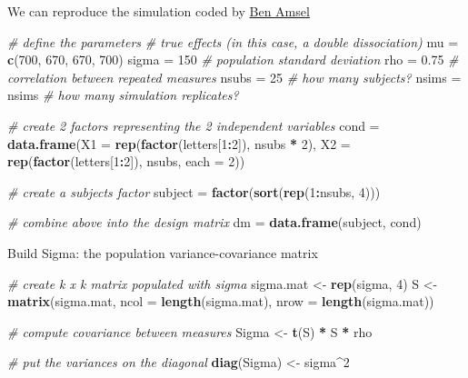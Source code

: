 \documentclass[
]{book}
\newenvironment{Shaded}{\begin{snugshade}}{\end{snugshade}}
\newcommand{\CommentTok}[1]{\textcolor[rgb]{0.56,0.35,0.01}{\textit{#1}}}
\newcommand{\DataTypeTok}[1]{\textcolor[rgb]{0.13,0.29,0.53}{#1}}
\newcommand{\DecValTok}[1]{\textcolor[rgb]{0.00,0.00,0.81}{#1}}
\newcommand{\FloatTok}[1]{\textcolor[rgb]{0.00,0.00,0.81}{#1}}
\newcommand{\KeywordTok}[1]{\textcolor[rgb]{0.13,0.29,0.53}{\textbf{#1}}}
\newcommand{\NormalTok}[1]{#1}
\newcommand{\OperatorTok}[1]{\textcolor[rgb]{0.81,0.36,0.00}{\textbf{#1}}}
\newcommand{\StringTok}[1]{\textcolor[rgb]{0.31,0.60,0.02}{#1}}
\begin{document}
We can reproduce the simulation coded by \href{https://cognitivedatascientist.com/2015/12/14/power-simulation-in-r-the-repeated-measures-anova-5/}{Ben Amsel}

\begin{Shaded}
\begin{Highlighting}[]
\CommentTok{# define the parameters}
\CommentTok{# true effects (in this case, a double dissociation)}
\NormalTok{mu =}\StringTok{ }\KeywordTok{c}\NormalTok{(}\DecValTok{700}\NormalTok{, }\DecValTok{670}\NormalTok{, }\DecValTok{670}\NormalTok{, }\DecValTok{700}\NormalTok{) }
\NormalTok{sigma =}\StringTok{ }\DecValTok{150}  \CommentTok{# population standard deviation}
\NormalTok{rho =}\StringTok{ }\FloatTok{0.75} \CommentTok{# correlation between repeated measures}
\NormalTok{nsubs =}\StringTok{ }\DecValTok{25} \CommentTok{# how many subjects?}
\NormalTok{nsims =}\StringTok{ }\NormalTok{nsims }\CommentTok{# how many simulation replicates?}
 
\CommentTok{# create 2 factors representing the 2 independent variables}
\NormalTok{cond =}\StringTok{ }\KeywordTok{data.frame}\NormalTok{(}\DataTypeTok{X1 =} \KeywordTok{rep}\NormalTok{(}\KeywordTok{factor}\NormalTok{(letters[}\DecValTok{1}\OperatorTok{:}\DecValTok{2}\NormalTok{]), nsubs }\OperatorTok{*}\StringTok{ }\DecValTok{2}\NormalTok{),}
                  \DataTypeTok{X2 =} \KeywordTok{rep}\NormalTok{(}\KeywordTok{factor}\NormalTok{(letters[}\DecValTok{1}\OperatorTok{:}\DecValTok{2}\NormalTok{]), nsubs, }\DataTypeTok{each =} \DecValTok{2}\NormalTok{))}
 
\CommentTok{# create a subjects factor}
\NormalTok{subject =}\StringTok{ }\KeywordTok{factor}\NormalTok{(}\KeywordTok{sort}\NormalTok{(}\KeywordTok{rep}\NormalTok{(}\DecValTok{1}\OperatorTok{:}\NormalTok{nsubs, }\DecValTok{4}\NormalTok{)))}
 
\CommentTok{# combine above into the design matrix}
\NormalTok{dm =}\StringTok{ }\KeywordTok{data.frame}\NormalTok{(subject, cond)}
\end{Highlighting}
\end{Shaded}

Build Sigma: the population variance-covariance matrix

\begin{Shaded}
\begin{Highlighting}[]
\CommentTok{# create k x k matrix populated with sigma}
\NormalTok{sigma.mat <-}\StringTok{ }\KeywordTok{rep}\NormalTok{(sigma, }\DecValTok{4}\NormalTok{)}
\NormalTok{S <-}
\StringTok{  }\KeywordTok{matrix}\NormalTok{(sigma.mat,}
  \DataTypeTok{ncol =} \KeywordTok{length}\NormalTok{(sigma.mat),}
  \DataTypeTok{nrow =} \KeywordTok{length}\NormalTok{(sigma.mat))}
 
\CommentTok{# compute covariance between measures}
\NormalTok{Sigma <-}\StringTok{ }\KeywordTok{t}\NormalTok{(S) }\OperatorTok{*}\StringTok{ }\NormalTok{S }\OperatorTok{*}\StringTok{ }\NormalTok{rho  }
 
\CommentTok{# put the variances on the diagonal }
\KeywordTok{diag}\NormalTok{(Sigma) <-}\StringTok{ }\NormalTok{sigma}\OperatorTok{^}\DecValTok{2}  
\end{Highlighting}
\end{Shaded}
\end{document}
